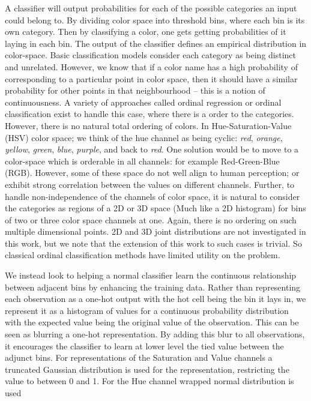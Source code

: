 \documentclass[11pt,letterpaper]{article}
\begin{document}
A classifier will output probabilities for each of the possible categories an input could belong to.
By dividing color space into threshold bins, where each bin is its own category.
Then by classifying a color, one gets getting probabilities of it laying in each bin. The output of the classifier defines an empirical distribution in color-space.
Basic classification models consider each category as being distinct and unrelated.
However, we know that if a color name has a high probability of corresponding to a particular point in color space, then it should have a similar probability for other points in that neighbourhood -- this is a notion of continuousness.
A variety of approaches called ordinal regression or ordinal classification exist to handle this case, where there is a order to the categories.
However, there is no natural total ordering of colors.
In Hue-Saturation-Value (HSV) color space; we think of the hue channel 
 as being cyclic: \emph{red}, \emph{orange}, \emph{yellow}, \emph{green}, \emph{blue}, \emph{purple}, and back to \emph{red}.
One solution would be to move to a color-space which is orderable in all channels: for example Red-Green-Blue (RGB).
However, some of these space do not well align to human perception; or exhibit strong correlation between the values on different channels.
Further, to handle non-independence of the channels of color space, it is natural to consider the categories as regions of a 2D or 3D space (Much like a 2D histogram) for bins of two or three color space channels at one.
Again, there is no ordering on such multiple dimensional points.
2D and 3D joint distributions are not investigated in this work, but we note that the extension of this work to such cases is trivial.
So classical ordinal classification methods have limited utility on the problem.

We instead look to helping a normal classifier learn the continuous relationship between adjacent bins by enhancing the training data.
Rather than representing each observation as a one-hot output with the hot cell being the bin it lays in, we represent it as a histogram of values for a continuous probability distribution with the expected value being the original value of the observation.
This can be seen as blurring a one-hot representation.
By adding this blur to all observations, it encourages the classifier to learn at lower level the tied value between the adjunct bins.
For representations of the Saturation and Value channels a truncated Gaussian distribution is used for the representation, restricting the value to between 0 and 1.
For the Hue channel wrapped normal distribution is used
\end{document}

